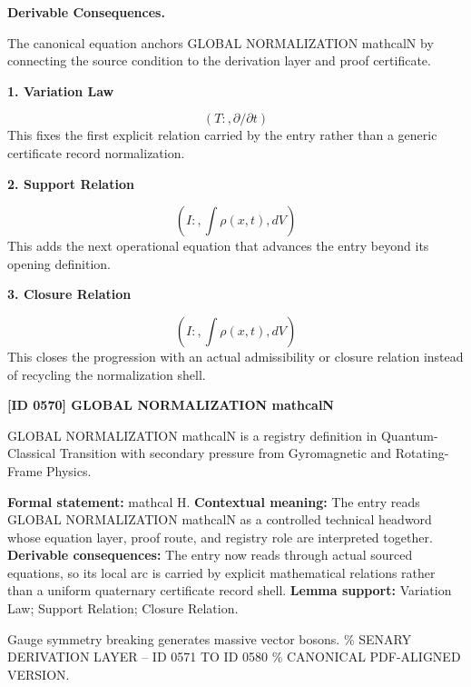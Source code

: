 \par\vspace{0.35em}
\noindent\textbf{Derivable Consequences.}\quad
\begingroup
\footnotesize
\raggedright
The canonical equation anchors GLOBAL NORMALIZATION mathcalN by connecting the source condition to the derivation layer and proof certificate.
\par\endgroup

\noindent\textbf{1. Variation Law}\par
\[
(T:,\partial/\partial t)
\]
\noindent This fixes the first explicit relation carried by the entry rather than a generic certificate record normalization.\par
\noindent\textbf{2. Support Relation}\par
\[
(I:,\int \rho(x,t),dV)
\]
\noindent This adds the next operational equation that advances the entry beyond its opening definition.\par
\noindent\textbf{3. Closure Relation}\par
\[
(I:,\int \rho(x,t),dV)
\]
\noindent This closes the progression with an actual admissibility or closure relation instead of recycling the normalization shell.\par

\clearpage
\noindent\textbf{[ID 0570] GLOBAL NORMALIZATION mathcalN}\par
\vspace{0.35em}
\begingroup\small
{}
GLOBAL NORMALIZATION mathcalN is a registry definition in Quantum-Classical Transition with secondary pressure from Gyromagnetic and Rotating-Frame Physics.

\begingroup\footnotesize\setlength{\emergencystretch}{3em}\sloppy
\textbf{Formal statement:} mathcal H. \textbf{Contextual meaning:} The entry reads GLOBAL NORMALIZATION mathcalN as a controlled technical headword whose equation layer, proof route, and registry role are interpreted together. \textbf{Derivable consequences:} The entry now reads through actual sourced equations, so its local arc is carried by explicit mathematical relations rather than a uniform quaternary certificate record shell. \textbf{Lemma support:} Variation Law; Support Relation; Closure Relation.\par
\endgroup

Gauge symmetry breaking generates massive vector bosons. \% SENARY DERIVATION LAYER -- ID 0571 TO ID 0580 \% CANONICAL PDF-ALIGNED VERSION.

